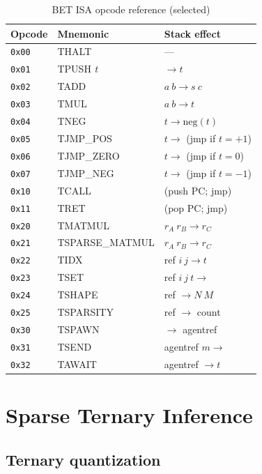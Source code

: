 \documentclass[journal,10pt,twocolumn]{IEEEtran}
\begin{document}
\begin{table}[h]
\centering
\small
\caption{BET ISA opcode reference (selected)}
\label{tab:isa}
\begin{tabular}{lll}
\toprule
Opcode & Mnemonic & Stack effect \\
\midrule
\texttt{0x00} & THALT            & --- \\
\texttt{0x01} & TPUSH \textit{t} & $\to t$ \\
\texttt{0x02} & TADD             & $a\ b \to s\ c$ \\
\texttt{0x03} & TMUL             & $a\ b \to t$ \\
\texttt{0x04} & TNEG             & $t \to \mathrm{neg}(t)$ \\
\texttt{0x05} & TJMP\_POS        & $t \to$ (jmp if $t=+1$) \\
\texttt{0x06} & TJMP\_ZERO       & $t \to$ (jmp if $t=0$) \\
\texttt{0x07} & TJMP\_NEG        & $t \to$ (jmp if $t=-1$) \\
\texttt{0x10} & TCALL            & (push PC; jmp) \\
\texttt{0x11} & TRET             & (pop PC; jmp) \\
\texttt{0x20} & TMATMUL          & $r_A\ r_B \to r_C$ \\
\texttt{0x21} & TSPARSE\_MATMUL  & $r_A\ r_B \to r_C$ \\
\texttt{0x22} & TIDX             & ref $i\ j \to t$ \\
\texttt{0x23} & TSET             & ref $i\ j\ t \to$ \\
\texttt{0x24} & TSHAPE           & ref $\to N\ M$ \\
\texttt{0x25} & TSPARSITY        & ref $\to$ count \\
\texttt{0x30} & TSPAWN           & $\to$ agentref \\
\texttt{0x31} & TSEND            & agentref $m \to$ \\
\texttt{0x32} & TAWAIT           & agentref $\to t$ \\
\bottomrule
\end{tabular}
\end{table}

\section{Sparse Ternary Inference}
\label{sec:sparse}

\subsection{Ternary quantization}
\end{document}
